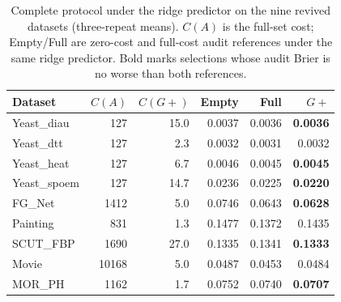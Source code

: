 \begin{table}[htbp]
\centering\small\renewcommand{\arraystretch}{1.2}\setlength{\tabcolsep}{4pt}
\caption{Complete protocol under the ridge predictor on the nine revived datasets (three-repeat means). $C(A)$ is the full-set cost; Empty/Full are zero-cost and full-cost audit references under the same ridge predictor. Bold marks selections whose audit Brier is no worse than both references.}
\label{tab:ridge-protocol}
\begin{tabular}{lrrrrr}\hline
Dataset & $C(A)$ & $C(G+)$ & Empty & Full & $G+$\\\hline
Yeast\_diau & 127 & 15.0 & 0.0037 & 0.0036 & \textbf{0.0036}\\
Yeast\_dtt & 127 & 2.3 & 0.0032 & 0.0031 & 0.0032\\
Yeast\_heat & 127 & 6.7 & 0.0046 & 0.0045 & \textbf{0.0045}\\
Yeast\_spoem & 127 & 14.7 & 0.0236 & 0.0225 & \textbf{0.0220}\\
FG\_Net & 1412 & 5.0 & 0.0746 & 0.0643 & \textbf{0.0628}\\
Painting & 831 & 1.3 & 0.1477 & 0.1372 & 0.1435\\
SCUT\_FBP & 1690 & 27.0 & 0.1335 & 0.1341 & \textbf{0.1333}\\
Movie & 10168 & 5.0 & 0.0487 & 0.0453 & 0.0484\\
MOR\_PH & 1162 & 1.7 & 0.0752 & 0.0740 & \textbf{0.0707}\\
\hline\end{tabular}\end{table}